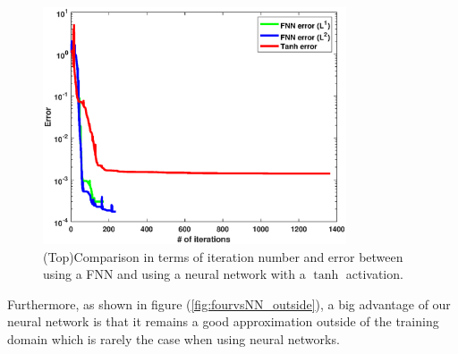 \documentclass[11pt]{article}
\begin{document}

 \begin{figure}[!htb]
    \centering
    \includegraphics[width=0.8\textwidth]{itertanhvsfnn.eps}
    \caption{(Top)Comparison in terms of iteration number and error between using a FNN and using a neural network with a $\tanh$ activation.}
    \label{fig:fourvsNN_iter}
\end{figure}
 Furthermore, as shown in figure (\ref{fig:fourvsNN_outside}), a big advantage of our neural network is that it remains a good approximation outside of the training domain which is rarely the case when using neural networks.
\end{document}
